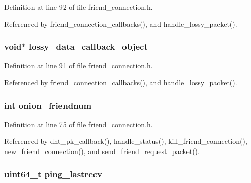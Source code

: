 Definition at line 92 of file friend\+\_\+connection.\+h.



Referenced by friend\+\_\+connection\+\_\+callbacks(), and handle\+\_\+lossy\+\_\+packet().

\hypertarget{struct_friend___conn_a5a1c6eb314a3e3142dd5ae3d3868491b}{
\subsubsection[{lossy\+\_\+data\+\_\+callback\+\_\+object}]{\setlength{\rightskip}{0pt plus 5cm}void$\ast$ lossy\+\_\+data\+\_\+callback\+\_\+object}}\label{struct_friend___conn_a5a1c6eb314a3e3142dd5ae3d3868491b}


Definition at line 91 of file friend\+\_\+connection.\+h.



Referenced by friend\+\_\+connection\+\_\+callbacks(), and handle\+\_\+lossy\+\_\+packet().

\hypertarget{struct_friend___conn_a009e6d32e21cc7fb0c8caded782e974b}{
\subsubsection[{onion\+\_\+friendnum}]{\setlength{\rightskip}{0pt plus 5cm}int onion\+\_\+friendnum}}\label{struct_friend___conn_a009e6d32e21cc7fb0c8caded782e974b}


Definition at line 75 of file friend\+\_\+connection.\+h.



Referenced by dht\+\_\+pk\+\_\+callback(), handle\+\_\+status(), kill\+\_\+friend\+\_\+connection(), new\+\_\+friend\+\_\+connection(), and send\+\_\+friend\+\_\+request\+\_\+packet().

\hypertarget{struct_friend___conn_a5130c3c4a93050475770184608d61918}{
\subsubsection[{ping\+\_\+lastrecv}]{\setlength{\rightskip}{0pt plus 5cm}uint64\+\_\+t ping\+\_\+lastrecv}}\label{struct_friend___conn_a5130c3c4a93050475770184608d61918}


